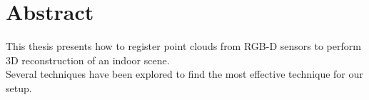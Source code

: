 
\chapter*{Abstract}

This thesis presents how to register point clouds from RGB-D sensors to perform 3D reconstruction of an indoor scene. \\
Several techniques have been explored to find the most effective technique for our setup.